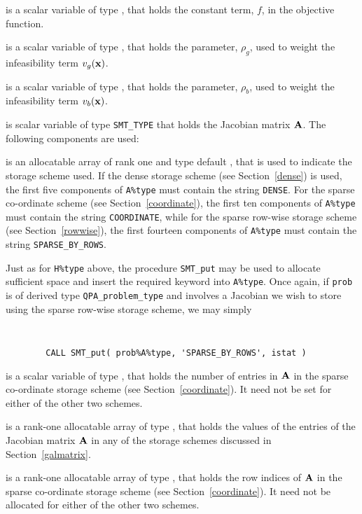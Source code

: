 \documentclass{galahad}
\newcommand{\packagename}{QPA}
\begin{document}
\begin{description}
 is a scalar variable of type \realdp, that holds 
the constant term, $f$, in the objective function.

 is a scalar variable of type \realdp, that holds 
the parameter, $\rho_g$, used to weight the infeasibility term $v_g({\mathbf{x}})$.

 is a scalar variable of type \realdp, that holds 
the parameter, $\rho_b$, used to weight the infeasibility term $v_b({\mathbf{x}})$.

 is scalar variable of type {\tt SMT\_TYPE} 
that holds the Jacobian matrix ${\mathbf{A}}$. The following components are used:

\begin{description}

 is an allocatable array of rank one and type default \character, that
is used to indicate the storage scheme used. If the dense storage scheme 
(see Section~\ref{dense}) is used, 
the first five components of {\tt A\%type} must contain the
string {\tt DENSE}.
For the sparse co-ordinate scheme (see Section~\ref{coordinate}), 
the first ten components of {\tt A\%type} must contain the
string {\tt COORDINATE}, while 
for the sparse row-wise storage scheme (see Section~\ref{rowwise}),
the first fourteen components of {\tt A\%type} must contain the
string {\tt SPARSE\_BY\_ROWS}.

Just as for {\tt H\%type} above, the procedure {\tt SMT\_put} 
may be used to allocate sufficient space and insert the required keyword
into {\tt A\%type}.
Once again, if {\tt prob} is of derived type {\tt \packagename\_problem\_type}
and involves a Jacobian we wish to store using the sparse row-wise 
storage scheme, we may simply
{\tt 
\begin{verbatim}
        CALL SMT_put( prob%A%type, 'SPARSE_BY_ROWS', istat )
\end{verbatim}
}
\noindent

 is a scalar variable of type \integer, that 
holds the number of entries in ${\mathbf{A}}$
in the sparse co-ordinate storage scheme (see Section~\ref{coordinate}). 
It need not be set for either of the other two schemes.

 is a rank-one allocatable array of type \realdp, that holds
the values of the entries of the Jacobian matrix ${\mathbf{A}}$ in any of the 
storage schemes discussed in Section~\ref{galmatrix}.

 is a rank-one allocatable array of type \integer,
that holds the row indices of ${\mathbf{A}}$ in the sparse co-ordinate storage
scheme (see Section~\ref{coordinate}). 
It need not be allocated for either of the other two schemes.


\end{description}
\end{description}
\end{document}
